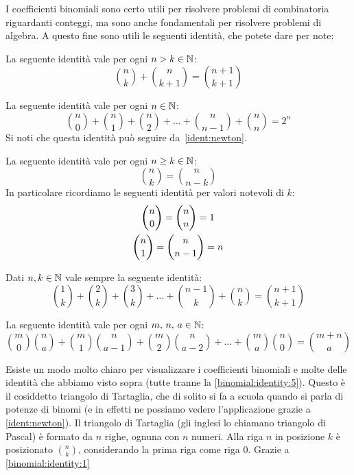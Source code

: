 \documentclass[11pt]{scrartcl}
\begin{document}
	I coefficienti binomiali sono certo utili per risolvere problemi di combinatoria riguardanti conteggi, ma sono anche fondamentali per risolvere problemi di algebra. A questo fine sono utili le seguenti identità, che potete dare per note:
	\begin{lemma}
		\label{binomial:identity:1}
		La seguente identità vale per ogni $n > k\in\mathbb N$:
		$$\binom{n}{k}+\binom{n}{k+1}=\binom{n+1}{k+1}$$
	\end{lemma}
	\begin{lemma}
		\label{binomial:identity:2}
		La seguente identità vale per ogni $n\in\mathbb N$:
		$$\binom{n}{0}+\binom{n}{1}+\binom{n}{2}+\dots+\binom{n}{n-1}+\binom{n}{n}=2^n$$
		Si noti che questa identità può seguire da~\ref{ident:newton}.
	\end{lemma}
	\begin{lemma}
		\label{binomial:identity:3}
		La seguente identità vale per ogni $n\ge k \in \mathbb N$:
		$$\binom{n}{k}=\binom{n}{n-k}$$
		In particolare ricordiamo le seguenti identità per valori notevoli di $k$:
		\begin{gather}
			\notag \binom{n}{0}=\binom{n}{n}=1 \\
			\notag \binom{n}{1}=\binom{n}{n-1}=n
		\end{gather}
	\end{lemma}
	\begin{lemma}
		\label{binomial:identity:4}
		Dati $n,k \in \mathbb N$ vale sempre la seguente identità:
		$$\binom{1}{k}+\binom{2}{k}+\binom{3}{k}+\dots+\binom{n-1}{k}+\binom{n}{k}=\binom{n+1}{k+1}$$
	\end{lemma}
	\begin{lemma}[Vandermonde]
		\label{binomial:identity:5}
		La seguente identità vale per ogni $m,\,n,\,a \in \mathbb N$:
		$$\binom{m}{0}\binom{n}{a}+\binom{m}{1}\binom{n}{a-1}+\binom{m}{2}\binom{n}{a-2}+\dots+\binom{m}{a}\binom{n}{0}=\binom{m+n}{a}$$
	\end{lemma}
	Esiste un modo molto chiaro per visualizzare i coefficienti binomiali e molte delle identità che abbiamo visto sopra (tutte tranne la \ref{binomial:identity:5}). Questo è il cosiddetto triangolo di Tartaglia, che di solito si fa a scuola quando si parla di potenze di binomi (e in effetti ne possiamo vedere l'applicazione grazie a \ref{ident:newton}). Il triangolo di Tartaglia (gli inglesi lo chiamano triangolo di Pascal) è formato da $n$ righe, ognuna con $n$ numeri. Alla riga $n$ in posizione $k$ è posizionato $\binom{n}{k}$, considerando la prima riga come riga $0$. Grazie a \ref{binomial:identity:1} 
\end{document}
